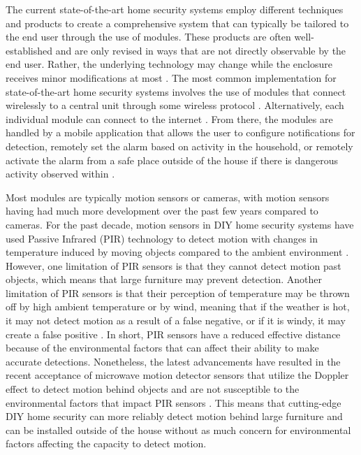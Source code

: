 \documentclass[conference]{IEEEtran}
\begin{document}
The current state-of-the-art home security systems employ different techniques and products
to create a comprehensive system that can typically be tailored to the end user through
the use of modules. These products are often well-established and are only revised in
ways that are not directly observable by the end user. Rather, the underlying technology
may change while the enclosure receives minor modifications at most \cite{sarhan2020}.
The most common implementation for state-of-the-art home security systems involves the
use of modules that connect wirelessly to a central unit through some wireless
protocol \cite{joseMalekian2017}. Alternatively, each individual module can connect
to the internet \cite{sarhan2020}. From there, the modules are handled by a mobile
application that allows the user to configure notifications for detection, remotely
set the alarm based on activity in the household, or remotely activate the alarm
from a safe place outside of the house if there is dangerous activity observed
within \cite{joseMalekian2017}.

Most modules are typically motion sensors or cameras, with motion sensors having had
much more development over the past few years compared to cameras. For the past
decade, motion sensors in DIY home security systems have used Passive Infrared (PIR)
technology to detect motion with changes in temperature induced by moving objects
compared to the ambient environment \cite{sarhan2020}. However, one limitation of
PIR sensors is that they cannot detect motion past objects, which means that large
furniture may prevent detection. Another limitation of PIR sensors is that their
perception of temperature may be thrown off by high ambient temperature or by wind,
meaning that if the weather is hot, it may not detect motion as a result of a
false negative, or if it is windy, it may create a false positive \cite{sarhan2020}.
In short, PIR sensors have a reduced effective distance because of the environmental
factors that can affect their ability to make accurate detections. Nonetheless, the
latest advancements have resulted in the recent acceptance of microwave motion
detector sensors that utilize the Doppler effect to detect motion behind objects
and are not susceptible to the environmental factors that impact PIR sensors \cite{sarhan2020}.
This means that cutting-edge DIY home security can more reliably detect motion behind
large furniture and can be installed outside of the house without as much concern for
environmental factors affecting the capacity to detect motion.
\end{document}
